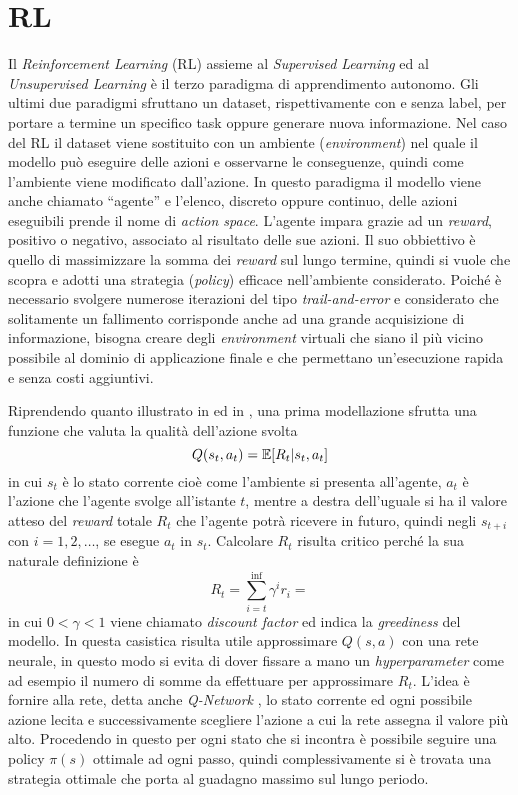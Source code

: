 

\section{RL}
Il \emph{Reinforcement Learning} (RL) assieme al \emph{Supervised Learning} ed al \emph{Unsupervised Learning} è il terzo paradigma di apprendimento autonomo.
Gli ultimi due paradigmi sfruttano un dataset, rispettivamente con e senza label, per portare a termine un specifico task oppure generare nuova informazione.
Nel caso del RL il dataset viene sostituito con un ambiente (\emph{environment}) nel quale il modello può eseguire delle azioni e osservarne le conseguenze, quindi come l'ambiente viene modificato dall'azione.
In questo paradigma il modello viene anche chiamato ``agente'' e l'elenco, discreto oppure continuo, delle azioni eseguibili prende il nome di \emph{action space}.
L'agente impara grazie ad un \emph{reward}, positivo o negativo, associato al risultato delle sue azioni.
Il suo obbiettivo è quello di massimizzare la somma dei \emph{reward} sul lungo termine, quindi si vuole che scopra e adotti una strategia (\emph{policy}) efficace nell'ambiente considerato.
Poiché è necessario svolgere numerose iterazioni del tipo \emph{trail-and-error} e considerato che solitamente un fallimento corrisponde anche ad una grande acquisizione di informazione, bisogna creare degli \emph{environment} virtuali che siano il più vicino possibile al dominio di applicazione finale e che permettano un'esecuzione rapida e senza costi aggiuntivi.
%

Riprendendo quanto illustrato in \cite{MIT_RL} ed in \cite{Simple_RL}, una prima modellazione sfrutta una funzione che valuta la qualità dell'azione svolta 
$$
Q(s_t, a_t) = \mathbb{E} [ R_t | s_t, a_t]
$$
in cui 
$s_t$ è lo stato corrente cioè come l'ambiente si presenta all'agente,
$a_t$ è l'azione che l'agente svolge all'istante $t$,
mentre a destra dell'uguale si ha il valore atteso del \emph{reward} totale $R_t$ che l'agente potrà ricevere in futuro, quindi negli $s_{t+i}$ con $i=1,2,\dots$, se esegue $a_t$ in $s_t$.
Calcolare $R_t$ risulta critico perché la sua naturale definizione è
$$
R_t = \sum_{i=t}^{\inf} \gamma^i r_i = 
$$
in cui $0 < \gamma < 1$  viene chiamato \emph{discount factor} ed indica la \emph{greediness} del modello. 
In questa casistica risulta utile approssimare $Q(s,a)$ con una rete neurale, in questo modo si evita di dover fissare a mano un \emph{hyperparameter} come ad esempio il numero di somme da effettuare per approssimare $R_t$.
L'idea è fornire alla rete, detta anche \emph{Q-Network} \cite{DQN}, lo stato corrente ed ogni possibile azione lecita e successivamente scegliere l'azione a cui la rete assegna il valore più alto.
Procedendo in questo per ogni stato che si incontra è possibile seguire una policy $\pi(s)$ ottimale ad ogni passo, quindi complessivamente si è trovata una strategia ottimale che porta al guadagno massimo sul lungo periodo.


